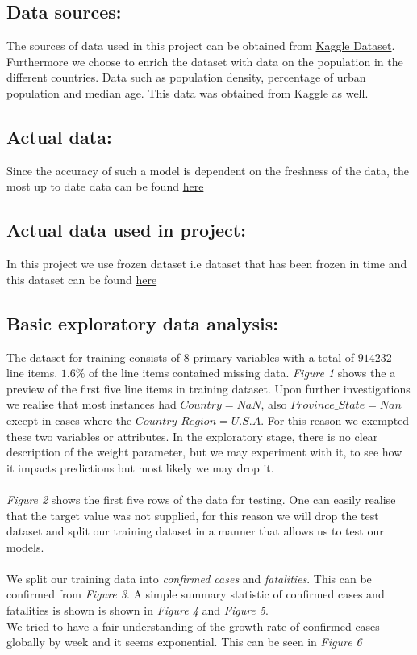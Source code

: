 \documentclass{article}
\begin{document}
\subsection{Data sources:}
The sources of data used in this project can be obtained from \href{https://www.kaggle.com/c/covid19-global-forecasting-week-5/overview}{Kaggle Dataset}.
Furthermore we choose to enrich the dataset with data on the population in the different countries. Data such as population density, percentage of urban population and median age.
This data was obtained from \href{https://www.kaggle.com/tanuprabhu/population-by-country-2020}{Kaggle} as well. 


\subsection{Actual data:}
Since the accuracy of such a model is dependent on the freshness of the data, the most up to date data can be found \href{https://www.kaggle.com/c/covid19-global-forecasting-week-5/overview}{here}

\subsection{Actual data used in project:}
In this project we use frozen dataset i.e dataset that has been frozen in time and this dataset can be found \href{https://github.com/acquayefrank/MLDM2020-Project/tree/master/data}{here}

\subsection{Basic exploratory data analysis:}
The dataset for training consists of $8$ primary variables with a total of $914232$ line items. $1.6\%$  of the line items contained missing data. \emph{Figure 1} shows the a preview of the first five line items in training dataset.  Upon further investigations we realise that most instances had $Country = NaN$, also $Province\_State = Nan$ except in cases where the $Country\_Region = U.S.A$. For this reason we exempted these two variables or attributes. In the exploratory stage, there is no clear description of the weight parameter, but we may experiment with it, to see how it impacts predictions but most likely we may drop it. 
\\
\\
 \emph{Figure 2} shows the first five rows of the data for testing. One can easily realise that the target value was not supplied, for this reason we will drop the test dataset and split our training dataset in a manner that allows us to test our models.
 \\
 \\
 We split our training data into \emph{confirmed cases} and  \emph{fatalities}. This can be confirmed from  \emph{Figure 3}. 
 A simple summary statistic of confirmed cases and fatalities is shown is shown in \emph{Figure 4} and \emph{Figure 5}.
 \\
 We tried to have a fair understanding of the growth rate of confirmed cases globally by week and it seems exponential. This can be seen in   \emph{Figure 6}
 
\end{document}

